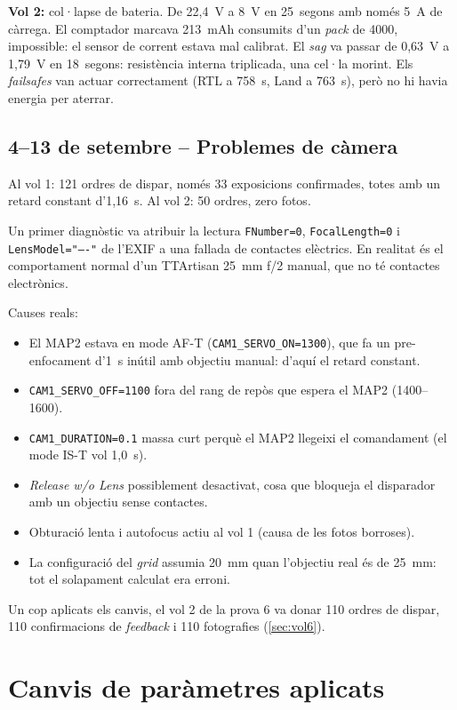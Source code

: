 \textbf{Vol 2:} col·lapse de bateria. De 22,4~V a 8~V en 25~segons amb només 5~A de càrrega. El comptador marcava 213~mAh consumits d'un \emph{pack} de 4000, impossible: el sensor de corrent estava mal calibrat. El \emph{sag} va passar de 0,63~V a 1,79~V en 18~segons: resistència interna triplicada, una cel·la morint. Els \emph{failsafes} van actuar correctament (RTL a 758~s, Land a 763~s), però no hi havia energia per aterrar.

\subsection{4--13 de setembre -- Problemes de càmera}
\label{subsec:problemes-camera}

Al vol 1: 121 ordres de dispar, només 33 exposicions confirmades, totes amb un retard constant d'1,16~s. Al vol 2: 50 ordres, zero fotos.

Un primer diagnòstic va atribuir la lectura \texttt{FNumber=0}, \texttt{FocalLength=0} i \texttt{LensModel="----"} de l'EXIF a una fallada de contactes elèctrics. En realitat és el comportament normal d'un TTArtisan 25~mm f/2 manual, que no té contactes electrònics.

Causes reals:
\begin{itemize}
    \item El MAP2 estava en mode AF-T (\texttt{CAM1\_SERVO\_ON=1300}), que fa un pre-enfocament d'1~s inútil amb objectiu manual: d'aquí el retard constant.
    \item \texttt{CAM1\_SERVO\_OFF=1100} fora del rang de repòs que espera el MAP2 (1400--1600).
    \item \texttt{CAM1\_DURATION=0.1} massa curt perquè el MAP2 llegeixi el comandament (el mode IS-T vol 1,0~s).
    \item \emph{Release w/o Lens} possiblement desactivat, cosa que bloqueja el disparador amb un objectiu sense contactes.
    \item Obturació lenta i autofocus actiu al vol 1 (causa de les fotos borroses).
    \item La configuració del \emph{grid} assumia 20~mm quan l'objectiu real és de 25~mm: tot el solapament calculat era erroni.
\end{itemize}

Un cop aplicats els canvis, el vol 2 de la prova 6 va donar 110 ordres de dispar, 110 confirmacions de \emph{feedback} i 110 fotografies (\cref{sec:vol6}).

\section{Canvis de paràmetres aplicats}
\label{sec:canvis-aplicats}


